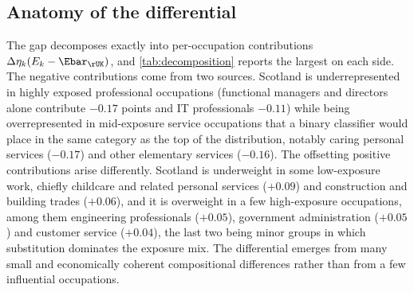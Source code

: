 \subsection{Anatomy of the differential}\label{sec:anatomy}
 
The gap decomposes exactly into per-occupation contributions $\Delta\eta_k (E_k - \Ebar_{\rUK})$, and \cref{tab:decomposition} reports the largest on each side. The negative contributions come from two sources. Scotland is underrepresented in highly exposed professional occupations (functional managers and directors alone contribute $-0.17$ points and IT professionals $-0.11$) while being overrepresented in mid-exposure service occupations that a binary classifier would place in the same category as the top of the distribution, notably caring personal services ($-0.17$) and other elementary services ($-0.16$). The offsetting positive contributions arise differently. Scotland is underweight in some low-exposure work, chiefly childcare and related personal services ($+0.09$) and construction and building trades ($+0.06$), and it is overweight in a few high-exposure occupations, among them engineering professionals ($+0.05$), government administration ($+0.05$) and customer service ($+0.04$), the last two being minor groups in which substitution dominates the exposure mix. The differential emerges from many small and economically coherent compositional differences rather than from a few influential occupations.
 
